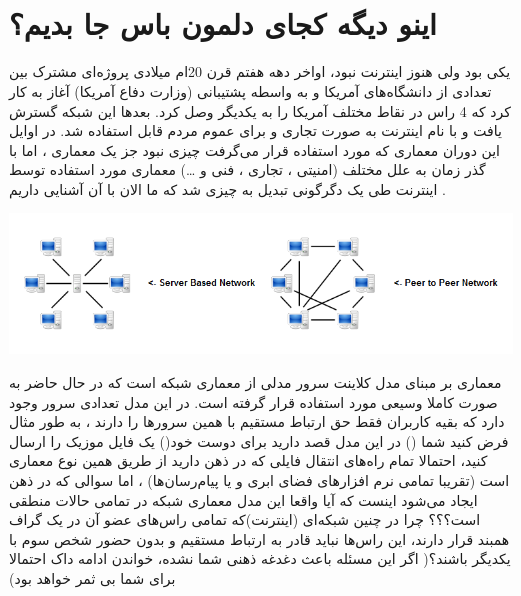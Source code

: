 \documentclass[]{article}
\begin{document}
\newpage
\pagestyle{fancy}
\fancyhf{}
\fancyfoot{}
\cfoot{\thepage}
\renewcommand{\headrulewidth}{2pt}

\KashidaOff



\tableofcontents

\newpage

 \Large \textbf{\\\\
}

\section*{{\titr اینو دیگه کجای دلمون باس جا بدیم؟}}


یکی بود ولی هنوز اینترنت نبود، اواخر دهه هفتم قرن 20ام میلادی پروژه‌ای مشترک بین تعدادی از دانشگاه‌های آمریکا و به واسطه پشتیبانی  (وزارت دفاع آمریکا) آغاز به کار کرد که 4 راس در نقاط مختلف آمریکا را به یکدیگر وصل کرد. بعدها این شبکه گسترش یافت و با نام اینترنت به صورت تجاری و برای عموم مردم قابل استفاده شد. در اوایل این دوران معماری که مورد استفاده قرار می‌گرفت چیزی نبود جز یک معماری  ، اما با گذر زمان به علل مختلف (امنیتی ، تجاری ، فنی و …) معماری مورد استفاده توسط اینترنت طی یک دگرگونی تبدیل به چیزی شد که ما الان با آن آشنایی داریم .

\begin{center}
\includegraphics[width=1\textwidth]{images/i0.png}
\end{center}

معماری بر مبنای مدل کلاینت سرور مدلی از معماری شبکه است که در حال حاضر به صورت کاملا وسیعی مورد استفاده قرار گرفته است. در این مدل تعدادی سرور وجود دارد که بقیه کاربران فقط حق ارتباط مستقیم با همین سرورها را دارند ، به طور مثال فرض کنید شما () در این مدل قصد دارید برای دوست خود() یک فایل موزیک را ارسال کنید، احتمالا تمام راه‌های انتقال فایلی که در ذهن دارید از طریق همین نوع معماری است (تقریبا تمامی نرم افزارهای فضای ابری و یا پیام‌رسان‌ها) ، اما سوالی که در ذهن ایجاد می‌شود اینست که آیا واقعا این مدل معماری شبکه در تمامی حالات منطقی است؟؟؟ چرا در چنین شبکه‌ای (اینترنت)که تمامی راس‌های عضو آن در یک گراف همبند قرار دارند، این راس‌ها نباید قادر به ارتباط مستقیم و بدون حضور شخص سوم با یکدیگر باشند؟( اگر این مسئله باعث دغدغه ذهنی شما نشده، خواندن ادامه داک احتمالا برای شما بی ثمر خواهد بود)
\end{document}
